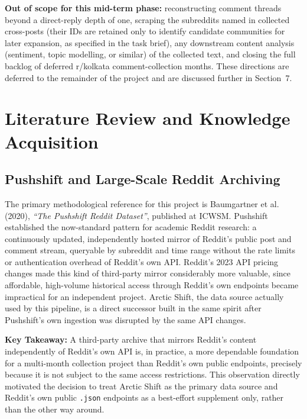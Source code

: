 \documentclass[12pt]{article}
\begin{document}
\textbf{Out of scope for this mid-term phase:} reconstructing comment threads beyond a direct-reply
depth of one, scraping the subreddits named in collected cross-posts (their IDs are retained only
to identify candidate communities for later expansion, as specified in the task brief), any
downstream content analysis (sentiment, topic modelling, or similar) of the collected text, and
closing the full backlog of deferred r/kolkata comment-collection months. These directions are
deferred to the remainder of the project and are discussed further in Section~7.


\section{Literature Review and Knowledge Acquisition}

\subsection{Pushshift and Large-Scale Reddit Archiving}
The primary methodological reference for this project is Baumgartner et al. (2020), \textit{``The
Pushshift Reddit Dataset''}, published at ICWSM. Pushshift established the now-standard pattern
for academic Reddit research: a continuously updated, independently hosted mirror of Reddit's
public post and comment stream, queryable by subreddit and time range without the rate limits
or authentication overhead of Reddit's own API. Reddit's 2023 API pricing changes made this kind
of third-party mirror considerably more valuable, since affordable, high-volume historical
access through Reddit's own endpoints became impractical for an independent project. Arctic
Shift, the data source actually used by this pipeline, is a direct successor built in the same
spirit after Pushshift's own ingestion was disrupted by the same API changes.

\textbf{Key Takeaway:} A third-party archive that mirrors Reddit's content independently of
Reddit's own API is, in practice, a more dependable foundation for a multi-month collection
project than Reddit's own public endpoints, precisely because it is not subject to the same
access restrictions. This observation directly motivated the decision to treat Arctic Shift as
the primary data source and Reddit's own public \texttt{.json} endpoints as a best-effort
supplement only, rather than the other way around.
\end{document}
